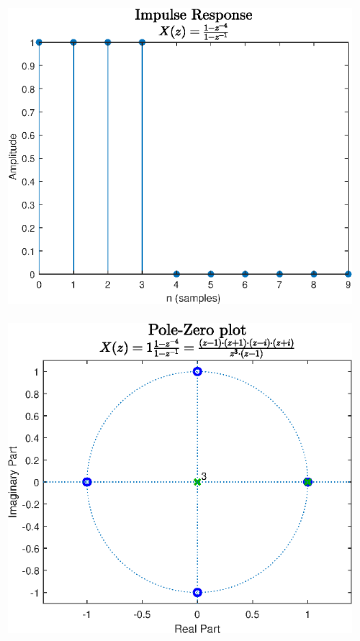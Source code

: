\begin{figure}
\centering
\begin{subfigure}{.5\linewidth}
\centering
\includegraphics[scale=0.45]{images/impulse_response_2.eps}
\caption{}
\label{fig:sub1}
\end{subfigure}%
\begin{subfigure}{.5\linewidth}
\centering
\includegraphics[scale=0.45]{images/pole_zero_2.eps}
\caption{}

\end{subfigure}
\end{figure}
